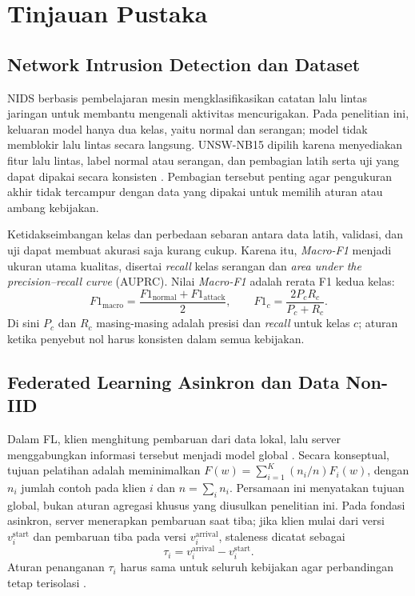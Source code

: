 \chapter{Tinjauan Pustaka}
\label{bab:pustaka}

\section{Network Intrusion Detection dan Dataset}
NIDS berbasis pembelajaran mesin mengklasifikasikan catatan lalu lintas jaringan untuk membantu mengenali aktivitas mencurigakan. Pada penelitian ini, keluaran model hanya dua kelas, yaitu normal dan serangan; model tidak memblokir lalu lintas secara langsung. UNSW-NB15 dipilih karena menyediakan fitur lalu lintas, label normal atau serangan, dan pembagian latih serta uji yang dapat dipakai secara konsisten \cite{moustafa2015,unswdata}. Pembagian tersebut penting agar pengukuran akhir tidak tercampur dengan data yang dipakai untuk memilih aturan atau ambang kebijakan.

Ketidakseimbangan kelas dan perbedaan sebaran antara data latih, validasi, dan uji dapat membuat akurasi saja kurang cukup. Karena itu, \textit{Macro-F1} menjadi ukuran utama kualitas, disertai \textit{recall} kelas serangan dan \textit{area under the precision--recall curve} (AUPRC). Nilai \textit{Macro-F1} adalah rerata F1 kedua kelas:
\begin{equation}
  F1_{\mathrm{macro}}=\frac{F1_{\mathrm{normal}}+F1_{\mathrm{attack}}}{2},\qquad
  F1_c=\frac{2P_cR_c}{P_c+R_c}.
\end{equation}
Di sini $P_c$ dan $R_c$ masing-masing adalah presisi dan \textit{recall} untuk kelas $c$; aturan ketika penyebut nol harus konsisten dalam semua kebijakan.

\section{Federated Learning Asinkron dan Data Non-IID}
Dalam FL, klien menghitung pembaruan dari data lokal, lalu server menggabungkan informasi tersebut menjadi model global \cite{mcmahan2017}. Secara konseptual, tujuan pelatihan adalah meminimalkan $F(w)=\sum_{i=1}^{K}(n_i/n)F_i(w)$, dengan $n_i$ jumlah contoh pada klien $i$ dan $n=\sum_i n_i$. Persamaan ini menyatakan tujuan global, bukan aturan agregasi khusus yang diusulkan penelitian ini. Pada fondasi asinkron, server menerapkan pembaruan saat tiba; jika klien mulai dari versi $v_i^{\mathrm{start}}$ dan pembaruan tiba pada versi $v_i^{\mathrm{arrival}}$, staleness dicatat sebagai
\begin{equation}
  \tau_i=v_i^{\mathrm{arrival}}-v_i^{\mathrm{start}}.
\end{equation}
Aturan penanganan $\tau_i$ harus sama untuk seluruh kebijakan agar perbandingan tetap terisolasi \cite{xie2019}.


